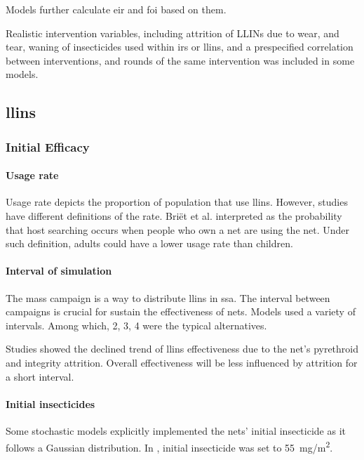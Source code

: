 \documentclass[a4paper, 12pt, twoside]{report}
\begin{document}
Models further calculate \gls{eir} and \gls{foi} based on them.

Realistic intervention variables, including attrition of LLINs due to wear, and tear, waning of insecticides used within \gls{irs} or \gls{llins}, and a prespecified correlation between interventions, and rounds of the same intervention was included in some models\cite{Walker2016}.

\subsection{\texorpdfstring{\gls{llins}}{LLINs}}%
\label{sub:llins}

\subsubsection{Initial Efficacy}%
\label{subsub:initial_efficacy}

\paragraph{Usage rate}%
\label{par:usage_rate}

Usage rate depicts the proportion of population that use \gls{llins}.
However, studies have different definitions of the rate.
Briët et al.\cite{Briet2013} interpreted as the probability that host searching occurs when people who own a net are using the net.
Under such definition, adults could have a lower usage rate than children.

\paragraph{Interval of simulation}%
\label{par:interval_of_simulation}
The mass campaign is a way to distribute \gls{llins} in \gls{ssa}.
The interval between campaigns is crucial for sustain the effectiveness of nets.
Models used a variety of intervals.
Among which, 2, 3, 4\cite{Walker2016} were the typical alternatives.

Studies showed the declined trend of \gls{llins} effectiveness due to the net's pyrethroid and integrity attrition.
Overall effectiveness will be less influenced by attrition for a short interval.

\paragraph{Initial insecticides}%
\label{par:initial_insecticides}
Some stochastic models explicitly implemented the nets' initial insecticide as it follows a Gaussian distribution.
In \cite{Briet2013}, initial insecticide was set to \SI{55}{mg/m^2}.
\end{document}
